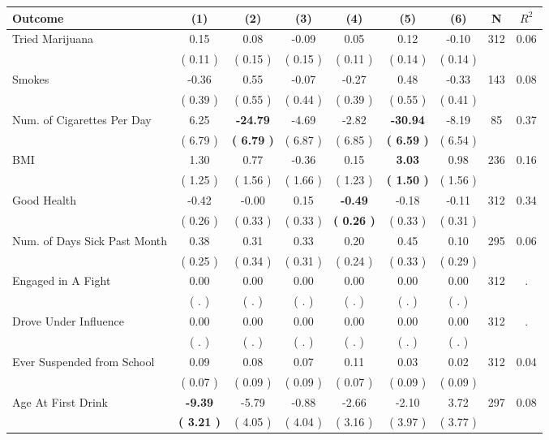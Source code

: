 \begin{tabular}{lcccccccc}
\toprule
 \textbf{Outcome} & \textbf{(1)} & \textbf{(2)} & \textbf{(3)} & \textbf{(4)} & \textbf{(5)} & \textbf{(6)} & \textbf{N} & \textbf{$ R^2$} \\
\midrule
Tried Marijuana &      0.15 &      0.08 &     -0.09 &      0.05 &      0.12 &     -0.10 & 312 &       0.06 \\ 
 & (     0.11 ) & (     0.15 ) & (     0.15 ) & (     0.11 ) & (     0.14 ) & (     0.14 ) & \\
Smokes &     -0.36 &      0.55 &     -0.07 &     -0.27 &      0.48 &     -0.33 & 143 &       0.08 \\ 
 & (     0.39 ) & (     0.55 ) & (     0.44 ) & (     0.39 ) & (     0.55 ) & (     0.41 ) & \\
Num. of Cigarettes Per Day &      6.25 & \textbf{   -24.79} &     -4.69 &     -2.82 & \textbf{   -30.94} &     -8.19 & 85 &       0.37 \\ 
 & (     6.79 ) & \textbf{(     6.79 )} & (     6.87 ) & (     6.85 ) & \textbf{(     6.59 )} & (     6.54 ) & \\
BMI &      1.30 &      0.77 &     -0.36 &      0.15 & \textbf{     3.03} &      0.98 & 236 &       0.16 \\ 
 & (     1.25 ) & (     1.56 ) & (     1.66 ) & (     1.23 ) & \textbf{(     1.50 )} & (     1.56 ) & \\
Good Health &     -0.42 &     -0.00 &      0.15 & \textbf{    -0.49} &     -0.18 &     -0.11 & 312 &       0.34 \\ 
 & (     0.26 ) & (     0.33 ) & (     0.33 ) & \textbf{(     0.26 )} & (     0.33 ) & (     0.31 ) & \\
Num. of Days Sick Past Month &      0.38 &      0.31 &      0.33 &      0.20 &      0.45 &      0.10 & 295 &       0.06 \\ 
 & (     0.25 ) & (     0.34 ) & (     0.31 ) & (     0.24 ) & (     0.33 ) & (     0.29 ) & \\
Engaged in A Fight &      0.00 &      0.00 &      0.00 &      0.00 &      0.00 &      0.00 & 312 &          . \\ 
 & (        . ) & (        . ) & (        . ) & (        . ) & (        . ) & (        . ) & \\
Drove Under Influence &      0.00 &      0.00 &      0.00 &      0.00 &      0.00 &      0.00 & 312 &          . \\ 
 & (        . ) & (        . ) & (        . ) & (        . ) & (        . ) & (        . ) & \\
Ever Suspended from School &      0.09 &      0.08 &      0.07 &      0.11 &      0.03 &      0.02 & 312 &       0.04 \\ 
 & (     0.07 ) & (     0.09 ) & (     0.09 ) & (     0.07 ) & (     0.09 ) & (     0.09 ) & \\
Age At First Drink & \textbf{    -9.39} &     -5.79 &     -0.88 &     -2.66 &     -2.10 &      3.72 & 297 &       0.08 \\ 
 & \textbf{(     3.21 )} & (     4.05 ) & (     4.04 ) & (     3.16 ) & (     3.97 ) & (     3.77 ) & \\
\bottomrule
\end{tabular}
